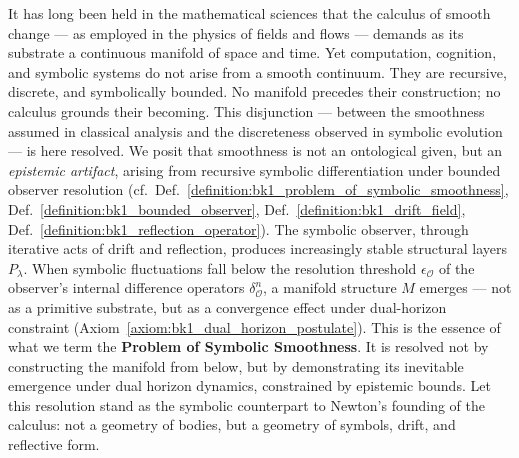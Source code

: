 \begin{scholium}
\label{scholium:bk1_resolution_of_continuum_disjunction}
It has long been held in the mathematical sciences that the calculus of smooth change — as employed in the physics of fields and flows — demands as its substrate a continuous manifold of space and time.
Yet computation, cognition, and symbolic systems do not arise from a smooth continuum. They are recursive, discrete, and symbolically bounded. No manifold precedes their construction; no calculus grounds their becoming.
This disjunction — between the smoothness assumed in classical analysis and the discreteness observed in symbolic evolution — is here resolved.
We posit that smoothness is not an ontological given, but an \textit{epistemic artifact}, arising from recursive symbolic differentiation under bounded observer resolution (cf.~Def.~\ref{definition:bk1_problem_of_symbolic_smoothness}, Def.~\ref{definition:bk1_bounded_observer}, Def.~\ref{definition:bk1_drift_field}, Def.~\ref{definition:bk1_reflection_operator}). The symbolic observer, through iterative acts of drift and reflection, produces increasingly stable structural layers $P_\lambda$. When symbolic fluctuations fall below the resolution threshold $\epsilon_{\mathcal{O}}$ of the observer's internal difference operators $\delta^n_{\mathcal{O}}$, a manifold structure $M$ emerges — not as a primitive substrate, but as a convergence effect under dual-horizon constraint (Axiom~\ref{axiom:bk1_dual_horizon_postulate}).
This is the essence of what we term the \textbf{Problem of Symbolic Smoothness}.
It is resolved not by constructing the manifold from below, but by demonstrating its inevitable emergence under dual horizon dynamics, constrained by epistemic bounds.
Let this resolution stand as the symbolic counterpart to Newton's founding of the calculus: not a geometry of bodies, but a geometry of symbols, drift, and reflective form.
\end{scholium}
